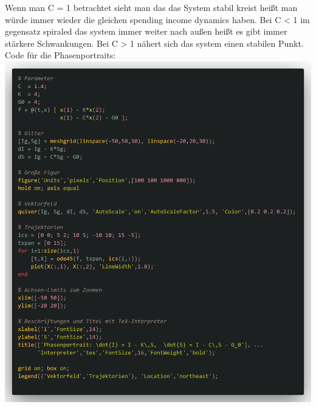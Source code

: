 \documentclass{scrartcl}
\begin{document}
Wenn man C = 1 betrachtet sieht man das das System stabil kreist heißt man würde immer wieder die gleichen spending income dynamics haben. Bei C < 1 im gegensatz spiraled das system immer weiter nach außen heißt es gibt immer stärkere Schwankungen. Bei C > 1 nähert sich das system einen stabilen Punkt.\\
Code für die Phasenportraits:\\
\includegraphics[scale =0.2]{code.png}
\end{document}
